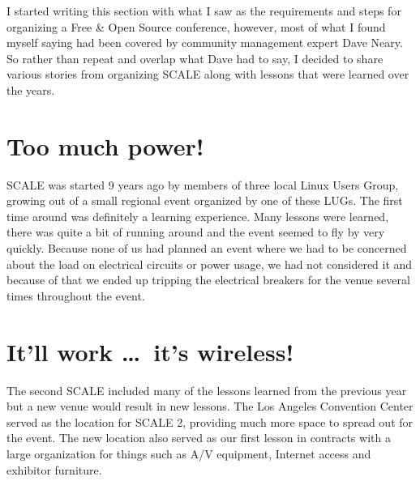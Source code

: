 

\noindent{}I started writing this section with what I saw as the requirements and steps for
organizing a Free \& Open Source conference, however, most of what I found myself saying had been covered by community management expert Dave Neary. So rather than repeat and overlap what Dave had to say, I decided to share various stories from organizing SCALE along with lessons that were learned over the years.

\section*{Too much power!}

SCALE was started 9 years ago by members of three local Linux Users Group,
growing out of a small regional event organized by one of these LUGs. The first
time around was definitely a learning experience. Many lessons were learned,
there was quite a bit of running around and the event seemed to fly by very
quickly. Because none of us had planned an event where we had to be
concerned about the load on electrical circuits or power usage, we had not
considered it and because of that we ended up tripping the electrical breakers
for the venue several times throughout the event.

\section*{It’ll work \dots\ it's wireless!}

The second SCALE included many of the lessons learned from the previous year but
a new venue would result in new lessons. The Los Angeles Convention Center
served as the location for SCALE 2, providing much more space to spread out for
the event. The new location also served as our first lesson in contracts with a
large organization for things such as A/V equipment, Internet access and
exhibitor furniture.  

